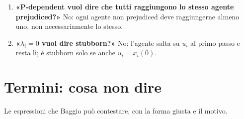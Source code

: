 \begin{enumerate}[leftmargin=1.6em,itemsep=3pt]
  \item \textbf{«P-dependent vuol dire che tutti raggiungono lo stesso agente prejudiced?»} No: ogni agente non prejudiced deve raggiungerne almeno uno, non necessariamente lo stesso.
  \item \textbf{«$\lambda_i=0$ vuol dire stubborn?»} No: l'agente salta su $u_i$ al primo passo e resta lì; è stubborn solo se anche $u_i=x_i(0)$.
\end{enumerate}

\section*{Termini: cosa non dire}

Le espressioni che Baggio può contestare, con la forma giusta e il motivo.

